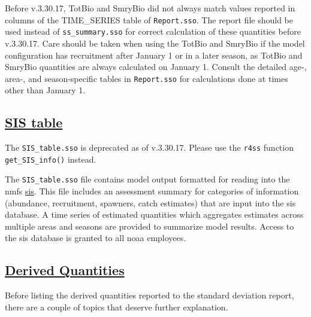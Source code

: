Before v.3.30.17, TotBio and SmryBio did not always match values reported in columns of the TIME\_SERIES table of \texttt{Report.sso}. The report file should be used instead of \texttt{ss\_summary.sso} for correct calculation of these quantities before v.3.30.17. Care should be taken when using the TotBio and SmryBio if the model configuration has recruitment after January 1 or in a later season, as TotBio and SmryBio quantities are always calculated on January 1. Consult the detailed age-, area-, and season-specific tables in \texttt{Report.sso} for calculations done at times other than January 1.

\hypertarget{SIStable}{}
\subsection[SIS table]{\protect\hyperlink{SIStable}{SIS table}}
The \texttt{SIS\_table.sso} is deprecated as of v.3.30.17. Please use the \texttt{r4ss} function \texttt{get\_SIS\_info()} instead. 

The \texttt{SIS\_table.sso} file contains model output formatted for reading into the \gls{nmfs} \href{https://www.st.nmfs.noaa.gov/sis/}{\gls{sis}}. This file includes an assessment summary for categories of information (abundance, recruitment, spawners, catch estimates) that are input into the \gls{sis} database. A time series of estimated quantities which aggregates estimates across multiple areas and seasons are provided to summarize model results. Access to the \gls{sis} database is granted to all \gls{noaa} employees.

\hypertarget{DerivedQuant}{}
\subsection[Derived Quantities]{\protect\hyperlink{DerivedQuant}{Derived Quantities}}
Before listing the derived quantities reported to the standard deviation report, there are a couple of topics that deserve further explanation.

\hypertarget{VirginUnfished}{}
